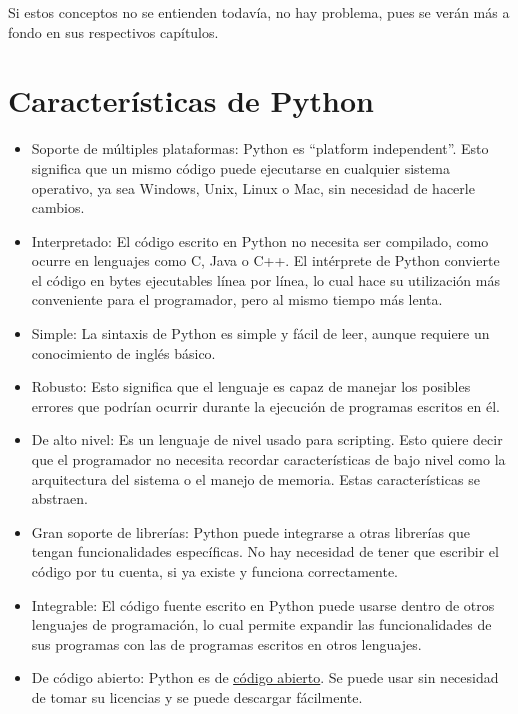 \documentclass{report}
\newcommand{\doble}[1]{``#1''}
\newcommand{\link}[2]{\href{#1}{\underline{#2}}}
\begin{document}
Si estos conceptos no se entienden todavía, no hay problema, pues se verán más a fondo en sus respectivos capítulos.

\section{Características de Python}

\begin{itemize}
  \item Soporte de múltiples plataformas: Python es \doble{platform independent}. Esto significa que un mismo código puede ejecutarse en cualquier sistema operativo, ya sea Windows, Unix, Linux o Mac, sin necesidad de hacerle cambios.
  
  \item Interpretado: El código escrito en Python no necesita ser compilado, como ocurre en lenguajes como C, Java o C++. El intérprete de Python convierte el código en bytes ejecutables línea por línea, lo cual hace su utilización más conveniente para el programador, pero al mismo tiempo más lenta.
  
  \item Simple: La sintaxis de Python es simple y fácil de leer, aunque requiere un conocimiento de inglés básico.
  
  \item Robusto: Esto significa que el lenguaje es capaz de manejar los posibles errores que podrían ocurrir durante la ejecución de programas escritos en él.
  
  \item De alto nivel: Es un lenguaje de nivel usado para scripting. Esto quiere decir que el programador no necesita recordar características de bajo nivel como la arquitectura del sistema o el manejo de memoria. Estas características se abstraen.
  
  \item Gran soporte de librerías: Python puede integrarse a otras librerías que tengan funcionalidades específicas. No hay necesidad de tener que escribir el código por tu cuenta, si ya existe y funciona correctamente.
  
  \item Integrable: El código fuente escrito en Python puede usarse dentro de otros lenguajes de programación, lo cual permite expandir las funcionalidades de sus programas con las de programas escritos en otros lenguajes.
  
  \item De código abierto: Python es de \link{https://opensource.org/about}{código abierto}. Se puede usar sin necesidad de tomar su licencias y se puede descargar fácilmente.
  

\end{itemize}
\end{document}
